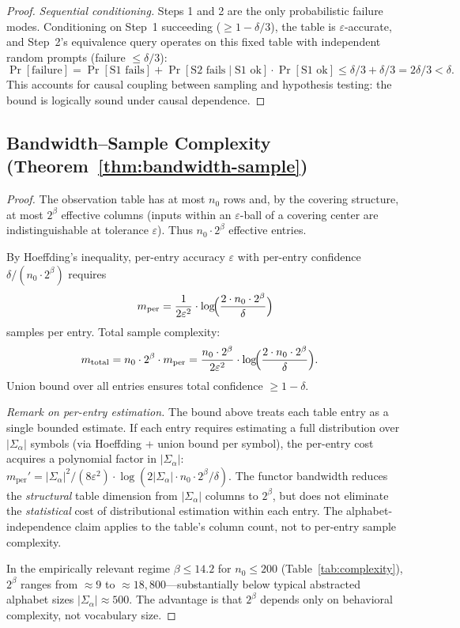 \documentclass[11pt]{article}
\begin{document}
\begin{proof}
\emph{Sequential conditioning.}
Steps 1 and 2 are the only probabilistic failure modes.
Conditioning on Step~1 succeeding ($\ge 1 - \delta/3$), the table
is $\varepsilon$-accurate, and Step~2's equivalence query operates
on this fixed table with independent random prompts (failure
$\le \delta/3$):
\[
  \Pr[\text{failure}] = \Pr[\text{S1 fails}] +
  \Pr[\text{S2 fails} \mid \text{S1 ok}] \cdot \Pr[\text{S1 ok}]
  \le \delta/3 + \delta/3 = 2\delta/3 < \delta.
\]
This accounts for causal coupling between sampling and hypothesis
testing: the bound is logically sound under causal dependence.
\end{proof}

\subsection{Bandwidth--Sample Complexity (Theorem~\ref{thm:bandwidth-sample})}

\begin{proof}
The observation table has at most $n_0$ rows and, by the covering
structure, at most $2^\beta$ effective columns (inputs within an
$\varepsilon$-ball of a covering center are indistinguishable at
tolerance $\varepsilon$).  Thus $n_0 \cdot 2^\beta$ effective entries.

By Hoeffding's inequality, per-entry accuracy $\varepsilon$ with
per-entry confidence $\delta / (n_0 \cdot 2^\beta)$ requires
\[
  m_{\mathrm{per}} = \frac{1}{2\varepsilon^2}
  \cdot \log\!\Bigl(\frac{2 \cdot n_0 \cdot 2^\beta}{\delta}\Bigr)
\]
samples per entry.  Total sample complexity:
\begin{align*}
  m_{\mathrm{total}} &= n_0 \cdot 2^\beta \cdot m_{\mathrm{per}}
  = \frac{n_0 \cdot 2^\beta}{2\varepsilon^2}
  \cdot \log\!\Bigl(\frac{2 \cdot n_0 \cdot 2^\beta}{\delta}\Bigr).
\end{align*}
Union bound over all entries ensures total confidence $\ge 1 - \delta$.

\emph{Remark on per-entry estimation.}  The bound above treats each
table entry as a single bounded estimate.  If each entry requires
estimating a full distribution over $|\Sigma_\alpha|$ symbols (via
Hoeffding + union bound per symbol), the per-entry cost acquires a
polynomial factor in $|\Sigma_\alpha|$:
$m_{\mathrm{per}}' = |\Sigma_\alpha|^2 / (8\varepsilon^2) \cdot
\log(2|\Sigma_\alpha| \cdot n_0 \cdot 2^\beta / \delta)$.
The functor bandwidth reduces the \emph{structural} table dimension
from $|\Sigma_\alpha|$ columns to $2^\beta$, but does not eliminate
the \emph{statistical} cost of distributional estimation within each
entry.  The alphabet-independence claim applies to the table's
column count, not to per-entry sample complexity.

In the empirically relevant regime $\beta \le 14.2$ for $n_0 \le 200$
(Table~\ref{tab:complexity}), $2^\beta$ ranges from ${\approx}9$ to
${\approx}18{,}800$---substantially below typical abstracted alphabet
sizes $|\Sigma_\alpha| \approx 500$.  The advantage is that $2^\beta$
depends only on behavioral complexity, not vocabulary size.
\end{proof}
\end{document}
